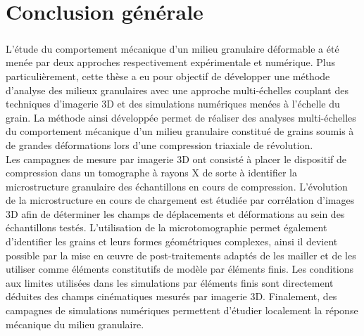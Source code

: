 \chapter{Conclusion générale}

\paragraph{}
L'étude du comportement mécanique d'un milieu granulaire déformable a été menée par deux approches respectivement expérimentale et numérique. Plus particulièrement, cette thèse a eu pour objectif de développer une méthode d'analyse des milieux granulaires avec une approche multi-échelles couplant des techniques d'imagerie 3D et des simulations numériques menées à l'échelle du grain. La méthode ainsi développée permet de réaliser des analyses multi-échelles du comportement mécanique d'un milieu granulaire constitué de grains soumis à de grandes déformations lors d’une compression triaxiale de révolution.
\\Les campagnes de mesure par imagerie 3D ont consisté à placer le dispositif de compression dans un tomographe à rayons X de sorte à identifier la microstructure granulaire des échantillons en cours de compression. L'évolution de la microstructure en cours de chargement est étudiée par corrélation d'images 3D afin de déterminer les champs de déplacements et déformations au sein des échantillons testés. L'utilisation de la microtomographie permet également d'identifier les grains et leurs formes géométriques complexes, ainsi il devient possible par la mise en \oe{}uvre de post-traitements adaptés de les mailler et de les utiliser comme éléments constitutifs de modèle par éléments finis. Les conditions aux limites utilisées dans les simulations par éléments finis sont directement déduites des champs cinématiques mesurés par imagerie 3D. Finalement, des campagnes de simulations numériques permettent d'étudier localement la réponse mécanique du milieu granulaire.

